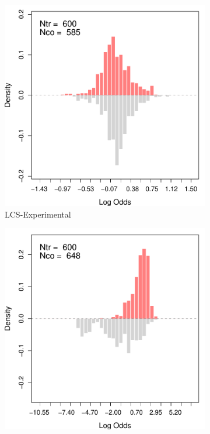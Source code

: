 \documentclass[letterpaper,12pt,leqno]{article}
\begin{document}
\begin{figure}[!ht]
    \caption{Assessing the Overlap in the Reconstructed LaLonde Female Samples}\label{fig:lcs.overlap}
    \centering
    \begin{minipage}[c]{\textwidth}
        \centering
        \begin{subfigure}{0.32\linewidth}
            \includegraphics[width=\linewidth]{odds_lcs_exp.pdf}
            \caption{LCS-Experimental}
        \end{subfigure}
        \begin{subfigure}{0.32\linewidth}
            \includegraphics[width=\linewidth]{odds_lcs_psid.pdf}

\end{subfigure}
\end{minipage}
\end{figure}
\end{document}

